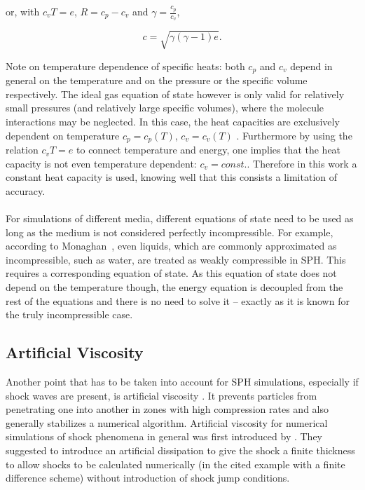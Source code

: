 \documentclass{report}
\begin{document}
or, with $c_v T=e$, $R=c_p-c_v$ and $\gamma=\frac{c_p}{c_v}$,

\begin{equation}
 c=\sqrt{\gamma(\gamma-1)e}.
\end{equation}

Note on temperature dependence of specific heats: both $c_p$ and $c_v$ depend in general on the temperature and on the pressure or the specific volume respectively. The ideal gas equation of state however is only valid for relatively small pressures (and relatively large specific volumes), where the molecule interactions may be neglected. In this case, the heat capacities are exclusively dependent on temperature $c_p=c_p(T)$, $c_v=c_v(T)$ \cite{EINTHERMOBUCH}. Furthermore by using the relation $c_v T=e$ to connect temperature and energy, one implies that the heat capacity is not even temperature dependent: $c_v=const.$. 
Therefore in this work a constant heat capacity is used, knowing well that this consists a limitation of accuracy.\\
\\
\indent
For simulations of different media, different equations of state need to be used as long as the medium is not considered perfectly incompressible. For example, according to Monaghan~\cite{Monaghan1994,Monaghan2005}, even liquids, which are commonly approximated as incompressible, such as water, are treated as weakly compressible in SPH. This requires a corresponding equation of state. As this equation of state does not depend on the temperature though, the energy equation is decoupled from the rest of the equations and there is no need to solve it -- exactly as it is known for the truly incompressible case.

\subsection{Artificial Viscosity}
\label{sec:ArtVisc}

Another point that has to be taken into account for SPH simulations, especially
if shock waves are present, is artificial viscosity \cite{Monaghan2005}. It
prevents particles from penetrating one into another in zones with high
compression rates and also generally stabilizes a numerical
algorithm.
Artificial viscosity for numerical simulations of shock phenomena
in general was first introduced by \cite{vonNeumann1950}. They suggested to
introduce an artificial dissipation to give the shock a finite thickness to 
allow shocks to be calculated numerically (in the cited example with a finite difference scheme) without introduction of shock jump conditions.
\end{document}
